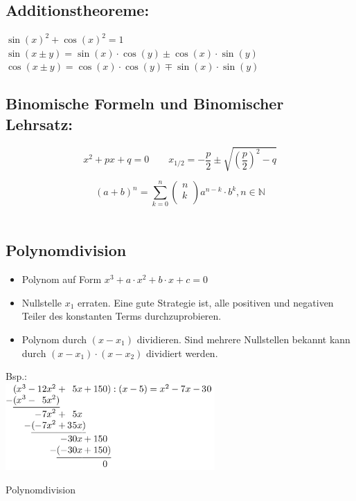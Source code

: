 \subsection{Additionstheoreme:}\label{subs:Additionstheoreme}
$\sin(x)^2 + \cos(x)^2 = 1$\\

$\sin(x\pm y) = \sin(x)\cdot \cos(y) \pm \cos(x)\cdot \sin(y)$\\

$\cos(x\pm y) = \cos(x)\cdot \cos(y) \mp \sin(x)\cdot \sin(y)$\\


\subsection{Binomische Formeln und Binomischer Lehrsatz:}\label{subs:quadr_lösungsformel}
\begin{equation}
	x^2+px+q=0 \qquad x_{1/2}=-\frac{p}{2} \pm \sqrt{\left(\frac{p}{2}\right)^2-q}
\end{equation}\label{Quadratische Lösungsformel}

\begin{equation}
	{(a+b)}^n = \sum\limits_{k=0}^n \left ( \begin{matrix}
		n\\
		k\\
	\end{matrix} \right ) a^{n-k}\cdot b^k ,n \in \mathbb{N}
\end{equation}\label{eq:Binomischer_Lehrsatz}
\ \\



\subsection{Polynomdivision}
\begin{itemize}
	\item Polynom auf Form $x^3 + a\cdot x^2 + b \cdot x + c = 0$
	\item Nullstelle $x_1$ erraten. Eine gute Strategie ist, alle positiven
	und negativen Teiler des konstanten Terms durchzuprobieren.
	\item Polynom durch $(x-x_1)$ dividieren. Sind mehrere Nullstellen bekannt kann durch $(x-x_1)\cdot (x-x_2)$ dividiert werden.
\end{itemize}

Bsp.:\\

\captionsetup{type=figure}
\includegraphics[width=0.6\textwidth]{../pictures/Polynomdivision.png}
\caption{Polynomdivision}\label{fig:Polynomdivision}

